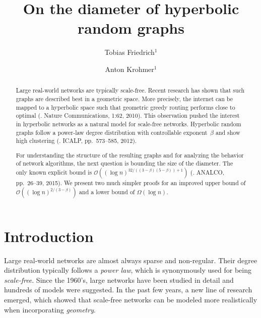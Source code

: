 \documentclass{llncs}
\newcommand{\Oh}{\mathcal{O}}
\begin{document}
\frontmatter

\title{On the diameter of hyperbolic random graphs}


\author{Tobias Friedrich$^{1}$ \and Anton Krohmer$^{1}$}







\maketitle

\pagestyle{headings}

\begin{abstract}
Large real-world networks are typically scale-free.
Recent research has shown that such graphs are described best in a geometric space.
More precisely, the internet can be mapped to a hyperbolic space such that geometric greedy
routing performs close to optimal (\citeauthor{boguna2010sustaining}. Nature Communications, 1:62, 2010).
This observation pushed the interest in hyperbolic networks as
a natural model for scale-free networks.
Hyperbolic random graphs follow a power-law degree distribution
with controllable exponent~$\beta$
and show high clustering
(\citeauthor{gugelmann2012random}. ICALP, pp.\ 573--585, 2012).

\medskip
\qquad
For understanding the structure of the resulting graphs and for analyzing the behavior of network algorithms,
the next question is bounding the size of the diameter.
The only known explicit bound is
$\Oh((\log n)^{32/((3-\beta)(5-\beta)) + 1})$
(\citeauthor{KiwiMitsche15}. ANALCO, pp.\ 26--39, 2015).
We present two much simpler proofs for an improved upper bound of $\Oh((\log n)^{2/(3-\beta)})$
and a lower bound of $\Omega(\log n)$.
\end{abstract}


\section{Introduction}

Large real-world networks are almost always sparse and non-regular. Their degree distribution
typically follows a \emph{power law}, which is synonymously used for being \emph{scale-free}.
Since the 1960's, large networks have been studied in detail and hundreds of models
were suggested. In the past few years, a new line of research emerged, which showed
that scale-free networks can be modeled more realistically when incorporating \emph{geometry}.
\end{document}
